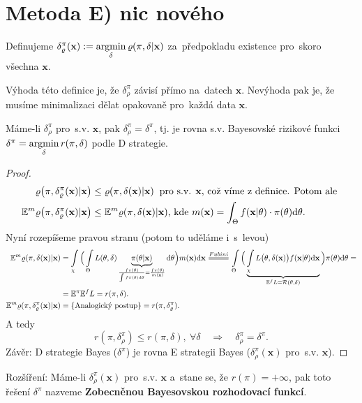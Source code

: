\section*{Metoda E) nic nového} 
Definujeme $\delta_\varrho^\pi(\textbf{x}):=\mathop{\mathrm{argmin}}\limits_{\delta}\varrho(\pi,\delta|\textbf{x})$ za~předpokladu existence pro~skoro všechna $\textbf{x}$.

\begin{remark}
	Výhoda této definice je, že $\delta_\rho^\pi$ závisí přímo na~datech $\textbf{x}$. Nevýhoda pak je, že musíme minimalizaci dělat opakovaně pro~každá data $\textbf{x}$.
\end{remark}
\begin{theorem}\label{veta_zamena}
	Máme-li $\delta_\rho^\pi$ pro~s.v. $\textbf{x}$, pak $\delta_\rho^\pi=\delta^\pi$, tj. je rovna s.v. Bayesovské rizikové funkci $\delta^\pi=\mathop{\mathrm{argmin}}\limits_\delta r(\pi,\delta)$ podle D strategie.
	\begin{proof}
		\[
		\begin{split}
		\varrho\big(\pi,\delta_\varrho^\pi(\textbf{x})|\textbf{x}\big)&\leq \varrho(\pi,\delta(\textbf{x})|\textbf{x}) \hspace{0.2cm} \text{pro s.v. \textbf{x}, což víme z~definice. Potom ale } \\
		\mathbb{E}^m\varrho\big(\pi,\delta_\varrho^\pi(\textbf{x})|\textbf{x}\big)&\leq \mathbb{E}^m\varrho(\pi,\delta(\textbf{x})|\textbf{x})\text{, kde } m(\textbf{x})=\int_{\Theta}f(\textbf{x}|\theta)\cdot \pi(\theta)\mathrm{d}\theta.
		\end{split}
		\]
		Nyní rozepíšeme pravou stranu (potom to uděláme i~s~levou)
		\[
		\begin{split}
		\E^m\rho(\pi,\delta(\textbf{x})|\textbf{x})&=\int\limits_{\chi}\Big( \int\limits_{\Theta} L(\t,\delta)\underbrace{\pi(\t|\textbf{x})}_{\frac{f\pi(\t)}{\int f\pi(\t)\d\t}=\frac{f\pi(\t)}{m(\textbf{x})}}\d\t\Big)m(\textbf{x})\d\textbf{x}\equal{Fubini}\int\limits_{\Theta}\Big( \underbrace{\int\limits_{\chi} L\big(\t,\delta(\textbf{x})\big)f(\textbf{x}|\t)\d\textbf{x}}_{\E^f L=\RF(\t,\delta)} \Big)\pi(\t)\d\t=\\&=\E^\pi\E^f L=r(\pi,\delta). \\
		\E^m\rho(\pi,\delta_\rho^\pi(\textbf{x})|\textbf{x})&=\{\text{Analogický postup}\}=r(\pi,\delta_\rho^\pi).
		\end{split}
		\]
		A tedy 
		$$ r(\pi,\delta_\rho^\pi)\leq r(\pi,\delta),~\forall\delta\quad \Rightarrow\quad \delta_\rho^\pi=\delta^\pi.$$
		Závěr: D strategie Bayes ($\delta^\pi$) je rovna E strategii Bayes ($\delta_\rho^\pi(\textbf{x})$ pro~s.v. $\textbf{x}$).
	\end{proof} 
\end{theorem}
Rozšíření: Máme-li $\delta_\rho^\pi(\textbf{x})$ pro~s.v. $\textbf{x}$ a~stane se, že $r(\pi)=+\infty$, pak toto řešení $\delta^{\pi}$ nazveme \textbf{Zobecněnou Bayesovskou rozhodovací funkcí}.

